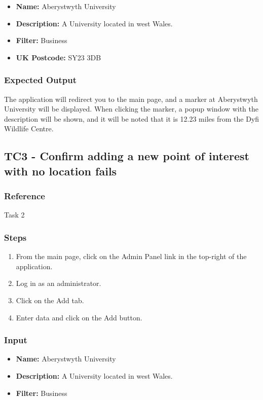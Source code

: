 \begin{itemize}
	\item \textbf{Name: } Aberystwyth University
	\item \textbf{Description: } A University located in west Wales.
	\item \textbf{Filter: } Business
	\item \textbf{UK Postcode: } SY23 3DB
\end{itemize}

\subsubsection{Expected Output}

The application will redirect you to the main page, and a marker at Aberystwyth University will be displayed. When clicking the marker, a popup window with the description will be shown, and it will be noted that it is 12.23 miles from the Dyfi Wildlife Centre.

\subsection{TC3 - Confirm adding a new point of interest with no location fails}

\subsubsection{Reference}

Task 2

\subsubsection{Steps}

\begin{enumerate}
	\item From the main page, click on the Admin Panel link in the top-right of the application.
	\item Log in as an administrator.
	\item Click on the Add tab.
	\item Enter data and click on the Add button.
\end{enumerate}	

\subsubsection{Input}

\begin{itemize}
	\item \textbf{Name: } Aberystwyth University
	\item \textbf{Description: } A University located in west Wales.
	\item \textbf{Filter: } Business
\end{itemize}


